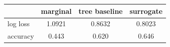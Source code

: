 \begin{tabular}{lccc}
\toprule
 & marginal & tree baseline & surrogate \\
\midrule
log loss & 1.0921 & 0.8632 & 0.8023 \\
accuracy & 0.443 & 0.620 & 0.646 \\
\bottomrule
\end{tabular}

